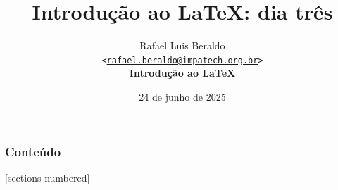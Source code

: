 \documentclass[numbering=fraction,aspectratio=169]{beamer}
\title{Introdução ao \LaTeX: dia três}
\author[Rafael Beraldo]{Rafael Luis Beraldo\\
  \texttt{<\href{mailto:rafael.beraldo@impatech.org.br}{rafael.beraldo@impatech.org.br}>}\\
  \textbf{Introdução ao \LaTeX}}
\institute{\IMPATech}
\date{24 de junho de 2025}
\begin{document}
\frenchspacing

\begin{frame}[plain]{}
  \maketitle
\end{frame}

\begin{frame}
  \frametitle{Conteúdo}
  [sections numbered]
  \begin{multicols}{2}
    \tableofcontents
  \end{multicols}
\end{frame}

















\end{document}

